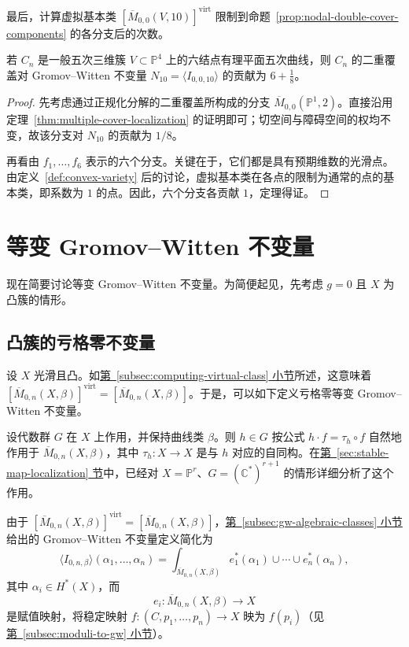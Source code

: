 最后，计算虚拟基本类 $[\overline M_{0,0}(V,10)]^{\mathrm{virt}}$ 限制到命题~\ref{prop:nodal-double-cover-components} 的各分支后的次数。
\begin{theorem}\label{thm:nodal-quintic-double-cover-contribution}
若 $C_n$ 是一般五次三维簇 $V\subset\mathbb P^4$ 上的六结点有理平面五次曲线，则 $C_n$ 的二重覆盖对 Gromov--Witten 不变量 $N_{10}=\langle I_{0,0,10}\rangle$ 的贡献为 $6+\frac18$。
\end{theorem}
\begin{proof}
先考虑通过正规化分解的二重覆盖所构成的分支 $\overline M_{0,0}(\mathbb P^1,2)$。直接沿用定理~\ref{thm:multiple-cover-localization} 的证明即可；切空间与障碍空间的权均不变，故该分支对 $N_{10}$ 的贡献为 $1/8$。

再看由 $f_1,\ldots,f_6$ 表示的六个分支。关键在于，它们都是具有预期维数的光滑点。由定义~\ref{def:convex-variety} 后的讨论，虚拟基本类在各点的限制为通常的点的基本类，即系数为 $1$ 的点。因此，六个分支各贡献 $1$，定理得证。
\end{proof}

\section{等变 Gromov--Witten 不变量}\label{sec:equivariant-gw}
现在简要讨论等变 Gromov--Witten 不变量。为简便起见，先考虑 $g=0$ 且 $X$ 为凸簇的情形。

\subsection{凸簇的亏格零不变量}\label{subsec:convex-equivariant-gw}
设 $X$ 光滑且凸。如\hyperref[subsec:computing-virtual-class]{第~\ref*{subsec:computing-virtual-class} 小节}所述，这意味着 $[\overline M_{0,n}(X,\beta)]^{\mathrm{virt}}=[\overline M_{0,n}(X,\beta)]$。于是，可以如下定义亏格零等变 Gromov--Witten 不变量。

设代数群 $G$ 在 $X$ 上作用，并保持曲线类 $\beta$。则 $h\in G$ 按公式 $h\cdot f=\tau_h\circ f$ 自然地作用于 $\overline M_{0,n}(X,\beta)$，其中 $\tau_h:X\to X$ 是与 $h$ 对应的自同构。在\hyperref[sec:stable-map-localization]{第~\ref*{sec:stable-map-localization} 节}中，已经对 $X=\mathbb P^r$、$G=(\mathbb C^*)^{r+1}$ 的情形详细分析了这个作用。

由于 $[\overline M_{0,n}(X,\beta)]^{\mathrm{virt}}=[\overline M_{0,n}(X,\beta)]$，\hyperref[subsec:gw-algebraic-classes]{第~\ref*{subsec:gw-algebraic-classes} 小节}给出的 Gromov--Witten 不变量定义简化为
\[
\langle I_{0,n,\beta}\rangle(\alpha_1,\ldots,\alpha_n)
=\int_{\overline M_{0,n}(X,\beta)}e_1^*(\alpha_1)\cup\cdots\cup e_n^*(\alpha_n),
\]
其中 $\alpha_i\in H^*(X)$，而
\[
e_i:\overline M_{0,n}(X,\beta)\longrightarrow X
\]
是赋值映射，将稳定映射 $f:(C,p_1,\ldots,p_n)\to X$ 映为 $f(p_i)$（见\hyperref[subsec:moduli-to-gw]{第~\ref*{subsec:moduli-to-gw} 小节}）。

